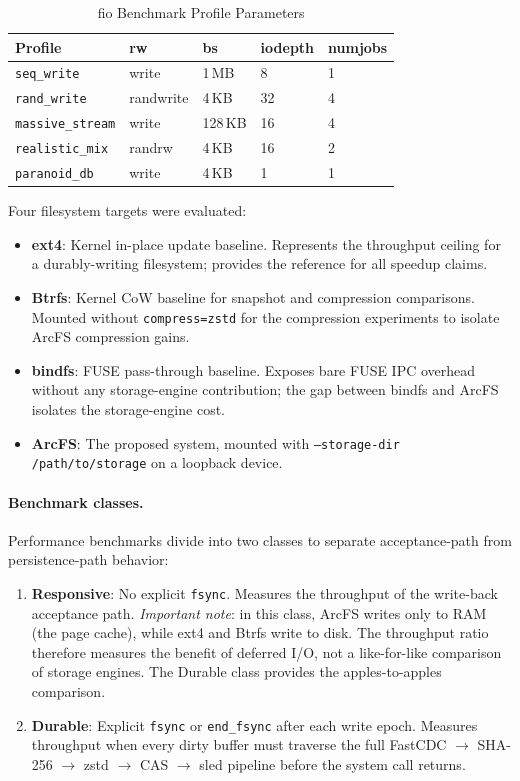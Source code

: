 \documentclass[5p,times]{elsarticle}
\begin{document}
\begin{table}[t]
\caption{fio Benchmark Profile Parameters}
\label{tab:fio}
\centering
\renewcommand{\arraystretch}{1.2}
\begin{tabular}{lllll}
\toprule
\textbf{Profile} & \textbf{rw} & \textbf{bs} & \textbf{iodepth} & \textbf{numjobs} \\
\midrule
\texttt{seq\_write}     & write      & 1\,MB & 8  & 1 \\
\texttt{rand\_write}    & randwrite  & 4\,KB & 32 & 4 \\
\texttt{massive\_stream}& write      & 128\,KB & 16 & 4 \\
\texttt{realistic\_mix} & randrw     & 4\,KB & 16 & 2 \\
\texttt{paranoid\_db}   & write      & 4\,KB & 1  & 1 \\
\bottomrule
\end{tabular}
\end{table}

Four filesystem targets were evaluated:

\begin{itemize}
\item \textbf{ext4}: Kernel in-place update baseline.  Represents the
  throughput ceiling for a durably-writing filesystem; provides the
  reference for all speedup claims.
\item \textbf{Btrfs}: Kernel CoW baseline for snapshot and compression
  comparisons.  Mounted without \texttt{compress=zstd} for the
  compression experiments to isolate ArcFS compression gains.
\item \textbf{bindfs}: FUSE pass-through baseline.  Exposes bare FUSE
  IPC overhead without any storage-engine contribution; the gap between
  bindfs and ArcFS isolates the storage-engine cost.
\item \textbf{ArcFS}: The proposed system, mounted with
  \texttt{--storage-dir /path/to/storage} on a loopback device.
\end{itemize}

\paragraph{Benchmark classes.}
Performance benchmarks divide into two classes to separate acceptance-path
from persistence-path behavior:
\begin{enumerate}
\item \textbf{Responsive}: No explicit \texttt{fsync}. Measures the
  throughput of the write-back acceptance path.  \emph{Important note}:
  in this class, ArcFS writes only to RAM (the page cache), while ext4
  and Btrfs write to disk.  The throughput ratio therefore measures the
  benefit of deferred I/O, not a like-for-like comparison of storage
  engines.  The Durable class provides the apples-to-apples comparison.
\item \textbf{Durable}: Explicit \texttt{fsync} or \texttt{end\_fsync}
  after each write epoch. Measures throughput when every dirty buffer
  must traverse the full FastCDC $\to$ SHA-256 $\to$ zstd $\to$ CAS
  $\to$ sled pipeline before the system call returns.
\end{enumerate}
\end{document}
